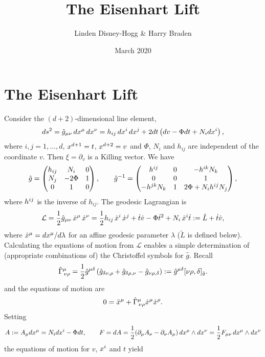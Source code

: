 \documentclass{article}
\title{The Eisenhart Lift}
\author{Linden Disney-Hogg \& Harry Braden}
\date{March 2020}
\begin{document}
\maketitle


\section{The Eisenhart Lift}
Consider the $(d+2)$-dimensional line element,
\begin{equation}
\label{eislift}
ds^2=\hat g_{\mu\nu}\,dx\sp{\mu}\,dx\sp{\nu}
=h_{ij}\, dx\sp{i}\, dx\sp{j}+2dt \left( dv-\Phi dt+N_i dx\sp{i}\right),
\end{equation}
where $i,j=1,\ldots,d$, $x\sp{d+1}=t$,  $x\sp{d+2}=v$ and $\Phi$, $N_i$ and $h_{ij}$ are independent of the coordinate $v$. Then
$\xi = \partial_v$ is a Killing vector.
We have
$$\hat g=\begin{pmatrix}h_{ij}&N_i&0\\ N_j&-2\Phi&1\\ 0&1&0\end{pmatrix},\qquad
\hat g\sp{-1}=\begin{pmatrix}h\sp{ij}&0&-h\sp{ik}N_k\\ 0&0&1\\ -h\sp{jk}N_k &1&2 \Phi+ N_i h\sp{ij} N_j\end{pmatrix},
$$
where $h\sp{ij}$ is the inverse of $h_{ij}$. The geodesic Lagrangian is
$$\mathcal{ L}=\frac12 \hat  g_{\mu\nu}\,\dot x\sp{\mu}\,\dot x\sp{\nu}=
\frac12 h_{ij}\, \dot x\sp{i}\, \dot x\sp{j}+\dot t \dot v-\Phi {\dot t}^2+N_i \,\dot x\sp{i}\dot t
:= \tilde{L}+\dot t \dot v  ,
$$
where $\dot x\sp{\mu}=dx\sp{\mu}/d\lambda$ for an affine geodesic parameter $\lambda$ ($\tilde{L}$ is defined below).
Calculating the equations of motion from $\mathcal{L}$ enables a simple determination of (appropriate
combinations of) the  Christoffel symbols for $\hat g$. Recall
$$\hat \Gamma\sp{\mu}_{\, \nu \rho}=\frac12 \hat g\sp{\mu \delta}\left(
\hat g_{\delta \nu, \rho} + \hat g_{\delta \rho, \nu} - \hat g_{ \nu \rho,\delta}\right)
:=  \hat g\sp{\mu \delta}[ \nu \rho,\delta]_{\hat g}.
$$
and the equations of motion are
$$ 0=\ddot x\sp{\mu}+ \hat \Gamma\sp{\mu}_{\, \nu \rho} \dot x\sp{\mu}\dot x\sp{\rho}.
$$
Setting
$$A:=A_\mu dx\sp{\mu}=N_i dx\sp{i}-\Phi dt,\qquad
F=dA=\frac12 (\partial_\mu A_\nu- \partial_\nu A_\mu)\, dx\sp\mu \wedge dx\sp\nu =\frac12 F_{\mu\nu}
\, dx\sp\mu \wedge dx\sp\nu
$$
the equations of motion for $v$, $x\sp{i}$ and $t$ yield
\end{document}
